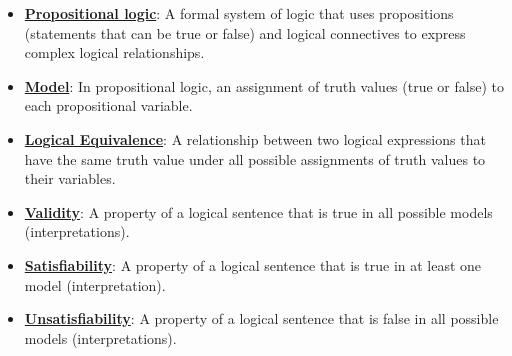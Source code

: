 \documentclass{article}%
\begin{document}
\begin{itemize}[leftmargin=*]%
\item \href{https://purdue.brightspace.com/d2l/common/assets/pdfjs-d2l-dist/1.0.14-legacy/web/viewer.html?file=\%2Fcontent\%2Fenforced\%2F1095467-wl.202510.CS.24300.001\%2F13L1-Logic.pdf\%3Fou\%3D1095467\&lang=en-us\&container=d2l-fileviewer-rendered-pdf\&fullscreen=d2l-fileviewer-rendered-pdf-dialog\&height=667#page=8}{\textbf{Propositional logic}}: A formal system of logic that uses propositions (statements that can be true or false) and logical connectives to express complex logical relationships.%
\item \href{https://purdue.brightspace.com/d2l/common/assets/pdfjs-d2l-dist/1.0.14-legacy/web/viewer.html?file=\%2Fcontent\%2Fenforced\%2F1095467-wl.202510.CS.24300.001\%2F13L1-Logic.pdf\%3Fou\%3D1095467\&lang=en-us\&container=d2l-fileviewer-rendered-pdf\&fullscreen=d2l-fileviewer-rendered-pdf-dialog\&height=667#page=9}{\textbf{Model}}: In propositional logic, an assignment of truth values (true or false) to each propositional variable.%
\item \href{https://purdue.brightspace.com/d2l/common/assets/pdfjs-d2l-dist/1.0.14-legacy/web/viewer.html?file=\%2Fcontent\%2Fenforced\%2F1095467-wl.202510.CS.24300.001\%2F13L1-Logic.pdf\%3Fou\%3D1095467\&lang=en-us\&container=d2l-fileviewer-rendered-pdf\&fullscreen=d2l-fileviewer-rendered-pdf-dialog\&height=667#page=12}{\textbf{Logical Equivalence}}: A relationship between two logical expressions that have the same truth value under all possible assignments of truth values to their variables.%
\item \href{https://purdue.brightspace.com/d2l/common/assets/pdfjs-d2l-dist/1.0.14-legacy/web/viewer.html?file=\%2Fcontent\%2Fenforced\%2F1095467-wl.202510.CS.24300.001\%2F13L1-Logic.pdf\%3Fou\%3D1095467\&lang=en-us\&container=d2l-fileviewer-rendered-pdf\&fullscreen=d2l-fileviewer-rendered-pdf-dialog\&height=667#page=13}{\textbf{Validity}}: A property of a logical sentence that is true in all possible models (interpretations).%
\item \href{https://purdue.brightspace.com/d2l/common/assets/pdfjs-d2l-dist/1.0.14-legacy/web/viewer.html?file=\%2Fcontent\%2Fenforced\%2F1095467-wl.202510.CS.24300.001\%2F13L1-Logic.pdf\%3Fou\%3D1095467\&lang=en-us\&container=d2l-fileviewer-rendered-pdf\&fullscreen=d2l-fileviewer-rendered-pdf-dialog\&height=667#page=13}{\textbf{Satisfiability}}: A property of a logical sentence that is true in at least one model (interpretation).%
\item \href{https://purdue.brightspace.com/d2l/common/assets/pdfjs-d2l-dist/1.0.14-legacy/web/viewer.html?file=\%2Fcontent\%2Fenforced\%2F1095467-wl.202510.CS.24300.001\%2F13L1-Logic.pdf\%3Fou\%3D1095467\&lang=en-us\&container=d2l-fileviewer-rendered-pdf\&fullscreen=d2l-fileviewer-rendered-pdf-dialog\&height=667#page=13}{\textbf{Unsatisfiability}}: A property of a logical sentence that is false in all possible models (interpretations).%

\end{itemize}
\end{document}
